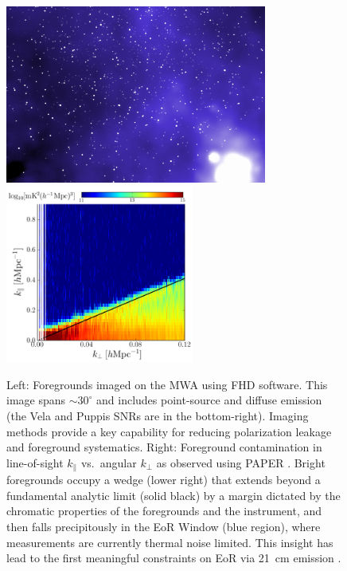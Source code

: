 \documentclass[preprint]{aastex}
\def\kperp{k_{\bot}}
\def\kpar{k_{\|}}
\begin{document}
\begin{figure}[t] \centering
\includegraphics[height=2.3in]{plots/MWApretty_crop.png} 
\includegraphics[height=2.3in]{plots/wedge_tall_wide.png} \caption{\small Left:
Foregrounds imaged on the MWA using FHD software.
This image spans $\sim$$30^{\circ}$ and
includes point-source and diffuse emission (the Vela and Puppis SNRs are in the
bottom-right). Imaging methods provide a key capability for reducing
polarization leakage and foreground systematics.  
Right: Foreground contamination in line-of-sight $\kpar$ vs.\ angular $\kperp$
as observed using PAPER \citep{pober_et_al2013}.
Bright foregrounds occupy
a wedge (lower right) that extends beyond a fundamental analytic limit
(solid black) by a margin dictated by the chromatic properties of the foregrounds
and the instrument, and then falls precipitously
in the EoR Window (blue
region), where measurements are currently thermal noise limited. This insight has lead to the
first meaningful constraints on EoR via 21~cm emission
\citep{parsons_et_al2013}.
}\label{fig:twoFGViews} \end{figure}

\end{document}
